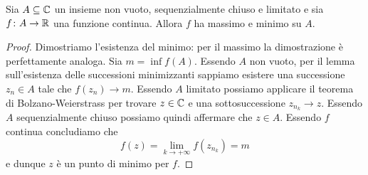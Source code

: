
\begin{theorem}
Sia $A\subseteq {\mathbb C}$ un insieme non vuoto, sequenzialmente chiuso e limitato e sia $f\colon A \to {\mathbb R}$ una funzione continua.
Allora $f$ ha massimo e minimo su $A$.
\end{theorem}
%
\begin{proof}
Dimostriamo l'esistenza del minimo: per il massimo la dimostrazione è perfettamente analoga.
Sia $m=\inf f(A)$.
Essendo $A$ non vuoto, per il lemma sull'esistenza delle successioni minimizzanti sappiamo esistere una successione $z_n \in A$ tale che $f(z_n) \to m$.
Essendo $A$ limitato possiamo applicare il teorema di Bolzano-Weierstrass per trovare $z\in {\mathbb C}$ e una sottosuccessione $z_{n_k} \to z$. Essendo $A$ sequenzialmente chiuso possiamo quindi affermare che $z\in A$. Essendo $f$ continua concludiamo che
\[
f(z) = \lim_{k\to+\infty} f(z_{n_k}) = m
\]
e dunque $z$ è un punto di minimo per $f$.
\end{proof}

